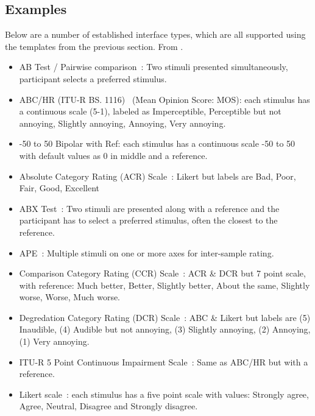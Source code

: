 \documentclass[11pt, oneside]{article}   	%
\begin{document}
	\subsection{Examples}
		Below are a number of established interface types, which are all supported using the templates from the previous section. %
		From \cite{waetwac}. 

		
		\begin{itemize}
			\item AB Test / Pairwise comparison~\cite{lipshitz1981great,david1963method}: Two stimuli presented simultaneously, participant selects a preferred stimulus.
			\item ABC/HR (ITU-R BS. 1116)~\cite{recommendation19971116} (Mean Opinion Score: MOS): each stimulus has a continuous scale (5-1), labeled as Imperceptible, Perceptible but not annoying, Slightly annoying, Annoying, Very annoying.
			\item -50 to 50 Bipolar with Ref: each stimulus has a continuous scale -50 to 50 with default values as 0 in middle and a reference.
			\item Absolute Category Rating (ACR) Scale~\cite{rec1996p}: Likert but labels are Bad, Poor, Fair, Good, Excellent 
			\item ABX Test~\cite{clark1982high}: Two stimuli are presented along with a reference and the participant has to select a preferred stimulus, often the closest to the reference.
			\item APE~\cite{ape}: Multiple stimuli on one or more axes for inter-sample rating.
			\item Comparison Category Rating (CCR) Scale~\cite{rec1996p}: ACR \& DCR but 7 point scale, with reference: Much better, Better, Slightly better, About the same, Slightly worse, Worse, Much worse.
			\item Degredation Category Rating (DCR) Scale~\cite{rec1996p}: ABC \& Likert but labels are (5) Inaudible, (4) Audible but not annoying, (3) Slightly annoying, (2) Annoying, (1) Very annoying.
			\item ITU-R 5 Point Continuous Impairment Scale~\cite{rec1997bs}: Same as ABC/HR but with a reference.
			\item Likert scale~\cite{likert1932technique}: each stimulus has a five point scale with values: Strongly agree, Agree, Neutral, Disagree and Strongly disagree.

\end{itemize}
\end{document}
